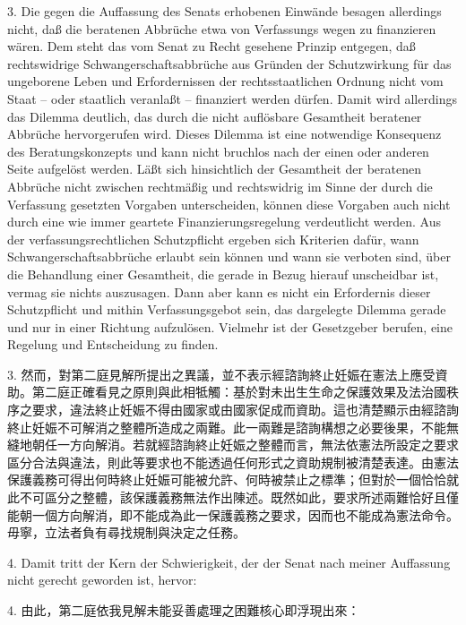 \documentclass[12pt]{article}
\begin{document}
\begin{sourcepara}[title={原文SondervotumB.328}]
3. Die gegen die Auffassung des Senats erhobenen Einwände besagen allerdings nicht, daß die beratenen Abbrüche etwa von Verfassungs wegen zu finanzieren wären. Dem steht das vom Senat zu Recht gesehene Prinzip entgegen, daß rechtswidrige Schwangerschaftsabbrüche aus Gründen der Schutzwirkung für das ungeborene Leben und Erfordernissen der rechtsstaatlichen Ordnung nicht vom Staat -- oder staatlich veranlaßt -- finanziert werden dürfen. Damit wird allerdings das Dilemma deutlich, das durch die nicht auflösbare Gesamtheit beratener Abbrüche hervorgerufen wird. Dieses Dilemma ist eine notwendige Konsequenz des Beratungskonzepts und kann nicht bruchlos nach der einen oder anderen Seite aufgelöst werden. Läßt sich hinsichtlich der Gesamtheit der beratenen Abbrüche nicht zwischen rechtmäßig und rechtswidrig im Sinne der durch die Verfassung gesetzten Vorgaben unterscheiden, können diese Vorgaben auch nicht durch eine wie immer geartete Finanzierungsregelung verdeutlicht werden. Aus der verfassungsrechtlichen Schutzpflicht ergeben sich Kriterien dafür, wann Schwangerschaftsabbrüche erlaubt sein können und wann sie verboten sind, über die Behandlung einer Gesamtheit, die gerade in Bezug hierauf unscheidbar ist, vermag sie nichts auszusagen. Dann aber kann es nicht ein Erfordernis dieser Schutzpflicht und mithin Verfassungsgebot sein, das dargelegte Dilemma gerade und nur in einer Richtung aufzulösen. Vielmehr ist der Gesetzgeber berufen, eine Regelung und Entscheidung zu finden.
\end{sourcepara}
\begin{transpara}
3. 然而，對第二庭見解所提出之異議，並不表示經諮詢終止妊娠在憲法上應受資助。第二庭正確看見之原則與此相牴觸：基於對未出生生命之保護效果及法治國秩序之要求，違法終止妊娠不得由國家或由國家促成而資助。這也清楚顯示由經諮詢終止妊娠不可解消之整體所造成之兩難。此一兩難是諮詢構想之必要後果，不能無縫地朝任一方向解消。若就經諮詢終止妊娠之整體而言，無法依憲法所設定之要求區分合法與違法，則此等要求也不能透過任何形式之資助規制被清楚表達。由憲法保護義務可得出何時終止妊娠可能被允許、何時被禁止之標準；但對於一個恰恰就此不可區分之整體，該保護義務無法作出陳述。既然如此，要求所述兩難恰好且僅能朝一個方向解消，即不能成為此一保護義務之要求，因而也不能成為憲法命令。毋寧，立法者負有尋找規制與決定之任務。
\end{transpara}

\begin{sourcepara}[title={原文SondervotumB.329}]
4. Damit tritt der Kern der Schwierigkeit, der der Senat nach meiner Auffassung nicht gerecht geworden ist, hervor:
\end{sourcepara}
\begin{transpara}
4. 由此，第二庭依我見解未能妥善處理之困難核心即浮現出來：
\end{transpara}
\end{document}
